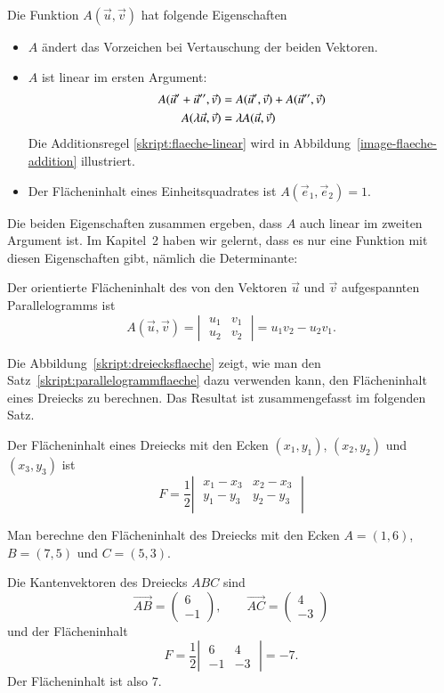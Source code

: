 Die Funktion $A(\vec u,\vec v)$ hat folgende Eigenschaften
\begin{itemize}
\item $A$ ändert das Vorzeichen bei Vertauschung der beiden Vektoren.
\item $A$ ist linear im ersten Argument:
\begin{align}
A(\vec u'+\vec u'',\vec v)&=A(\vec u',\vec v)+A(\vec u'',\vec v)
\label{skript:flaeche-linear}
\\
A(\lambda \vec u,\vec v)&=\lambda A(\vec u,\vec v)
\notag
\end{align}
Die Additionsregel \ref{skript:flaeche-linear} wird in
Abbildung~\ref{image-flaeche-addition} illustriert.
\item Der Flächeninhalt eines Einheitsquadrates ist $A(\vec e_1,\vec e_2)=1$.
\end{itemize}
Die beiden Eigenschaften zusammen ergeben, dass $A$ auch linear im
zweiten Argument ist.
Im Kapitel~2 haben wir gelernt, dass es nur eine
Funktion mit diesen Eigenschaften gibt, nämlich die Determinante:
\begin{satz}
\label{skript:parallelogrammflaeche}
Der orientierte Flächeninhalt des von den Vektoren $\vec u$ und $\vec v$
aufgespannten Parallelogramms ist
\[
A(\vec u,\vec v)=\left|\;\begin{matrix}u_1&v_1\\u_2&v_2\end{matrix}\;\right|
=u_1v_2-u_2v_1
.
\]
\end{satz}
Die Abbildung~\ref{skript:dreiecksflaeche} zeigt, wie man den
Satz~\ref{skript:parallelogrammflaeche} dazu verwenden kann, den Flächeninhalt
eines Dreiecks zu berechnen.
Das Resultat ist zusammengefasst im folgenden Satz.
\begin{satz}
Der Flächeninhalt eines Dreiecks mit den Ecken $(x_1,y_1)$, $(x_2,y_2)$ und
$(x_3,y_3)$ ist
\[
F=
\frac12\left|\;
\begin{matrix}
x_1-x_3&x_2-x_3\\
y_1-y_3&y_2-y_3\\
\end{matrix}
\;\right|
\]
\end{satz}

\begin{beispiel}
Man berechne den Flächeninhalt des Dreiecks mit den Ecken
$A=(1,6)$, $B=(7,5)$ und $C=(5,3)$.

\smallskip

{\parindent 0pt Die Kantenvektoren} des Dreiecks $ABC$ sind
\[
\overrightarrow{AB}=\begin{pmatrix}6\\-1\end{pmatrix}
,\qquad
\overrightarrow{AC}=\begin{pmatrix}4\\-3\end{pmatrix}
\]
und der Flächeninhalt
\[
F=\frac12\left|\;\begin{matrix}
   6&  4\\
  -1& -3
\end{matrix}\;\right|=
-7
.
\]
Der Flächeninhalt ist also $7$.
\end{beispiel}


